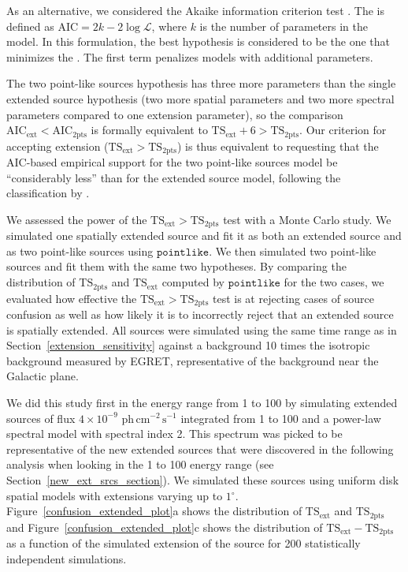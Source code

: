 \documentclass[12pt,preprint]{aastex}
\newcommand{\gev}{\text{GeV}\xspace}
\newcommand{\phflux}{\ensuremath{\text{ph}\,\text{cm}^{-2}\,\text{s}^{-1}}\xspace}
\newcommand{\tsext}{{\ensuremath{\text{TS}_{\text{ext}}}}\xspace}
\newcommand{\tsinc}{\ensuremath{\text{TS}_{\text{2pts}}}\xspace}
\newcommand{\likelihood}{\ensuremath{\mathcal{L}}\xspace}
\newcommand{\aic}{\text{AIC}\xspace}
\newcommand{\pointlike}{\ensuremath{\mathtt{pointlike}}\xspace}
\newcommand{\degree}{\ensuremath{^\circ}\xspace}
\begin{document}
As an alternative, we considered the Akaike information criterion test \citep[\aic,][]{AIC_statistical_test}.
The \aic is defined as $\aic=2k-2\log\likelihood$, where $k$ is the number of parameters in the model. 
In this formulation, the best hypothesis is considered to be the one that minimizes the \aic.
The first term penalizes models with additional parameters. 

The two point-like sources hypothesis has three more parameters than
the single extended source hypothesis (two more spatial parameters and
two more spectral parameters compared to one extension parameter), so the
comparison $\aic_\text{ext} < \aic_\text{2pts}$  is formally equivalent to
$\tsext + 6 > \tsinc$.  Our criterion for accepting extension ($\tsext > \tsinc$) 
is thus equivalent to requesting that the AIC-based empirical
support for the two point-like sources model be ``considerably less''
than for the extended source model, following the classification by
\cite{aic_stats_book}.

We assessed the power of the $\tsext>\tsinc$ test with a Monte Carlo
study.  We simulated one spatially extended source and fit it as both
an extended source and as two point-like sources using \pointlike.
We then simulated two point-like sources and fit them with the same two
hypotheses. By comparing the distribution of \tsinc and \tsext computed by
\pointlike for the two cases, we evaluated how effective the $\tsext>\tsinc$
test is at rejecting cases of source confusion as well as how
likely it is to incorrectly reject that an extended source is spatially
extended.  All sources were simulated using the same time range as in
Section~\ref{extension_sensitivity} against a background 10 times the
isotropic background measured by EGRET, representative of the background
near the Galactic plane.

We did this study first in the energy range from 1 \gev to 100 \gev by
simulating extended sources of flux $4\times10^{-9}$ \phflux integrated
from 1 \gev to 100 \gev and a power-law spectral model with
spectral index 2.  This spectrum was picked to be representative of the
new extended sources that were discovered in the following analysis
when looking in the 1 \gev to 100 \gev energy range
(see Section~\ref{new_ext_srcs_section}).
We simulated these sources using uniform disk spatial models
with extensions varying
up to $1\degree$.  
Figure~\ref{confusion_extended_plot}a shows the distribution
of \tsext and \tsinc and 
Figure~\ref{confusion_extended_plot}c shows 
the distribution of $\tsext-\tsinc$ as a
function of the simulated extension of the source
for 200 statistically independent simulations.
\end{document}
